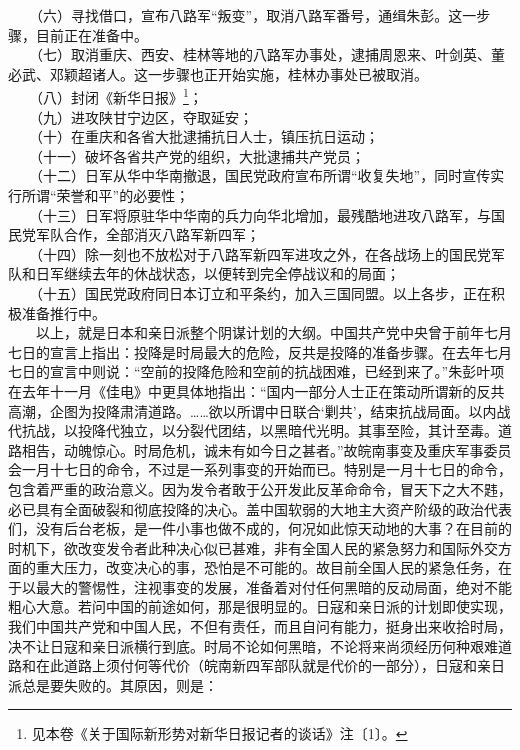 \documentclass[cn,11pt,chinese]{elegantbook}
\begin{document}
　　（六）寻找借口，宣布八路军“叛变”，取消八路军番号，通缉朱彭。这一步骤，目前正在准备中。\\
　　（七）取消重庆、西安、桂林等地的八路军办事处，逮捕周恩来、叶剑英、董必武、邓颖超诸人。这一步骤也正开始实施，桂林办事处已被取消。\\
　　（八）封闭《新华日报》\footnote[3]{ 见本卷《关于国际新形势对新华日报记者的谈话》注〔1〕。}；\\
　　（九）进攻陕甘宁边区，夺取延安；\\
　　（十）在重庆和各省大批逮捕抗日人士，镇压抗日运动；\\
　　（十一）破坏各省共产党的组织，大批逮捕共产党员；\\
　　（十二）日军从华中华南撤退，国民党政府宣布所谓“收复失地”，同时宣传实行所谓“荣誉和平”的必要性；\\
　　（十三）日军将原驻华中华南的兵力向华北增加，最残酷地进攻八路军，与国民党军队合作，全部消灭八路军新四军；\\
　　（十四）除一刻也不放松对于八路军新四军进攻之外，在各战场上的国民党军队和日军继续去年的休战状态，以便转到完全停战议和的局面；\\
　　（十五）国民党政府同日本订立和平条约，加入三国同盟。以上各步，正在积极准备推行中。\\
　　以上，就是日本和亲日派整个阴谋计划的大纲。中国共产党中央曾于前年七月七日的宣言上指出：投降是时局最大的危险，反共是投降的准备步骤。在去年七月七日的宣言中则说：“空前的投降危险和空前的抗战困难，已经到来了。”朱彭叶项在去年十一月《佳电》中更具体地指出：“国内一部分人士正在策动所谓新的反共高潮，企图为投降肃清道路。……欲以所谓中日联合‘剿共’，结束抗战局面。以内战代抗战，以投降代独立，以分裂代团结，以黑暗代光明。其事至险，其计至毒。道路相告，动魄惊心。时局危机，诚未有如今日之甚者。”故皖南事变及重庆军事委员会一月十七日的命令，不过是一系列事变的开始而已。特别是一月十七日的命令，包含着严重的政治意义。因为发令者敢于公开发此反革命命令，冒天下之大不韪，必已具有全面破裂和彻底投降的决心。盖中国软弱的大地主大资产阶级的政治代表们，没有后台老板，是一件小事也做不成的，何况如此惊天动地的大事？在目前的时机下，欲改变发令者此种决心似已甚难，非有全国人民的紧急努力和国际外交方面的重大压力，改变决心的事，恐怕是不可能的。故目前全国人民的紧急任务，在于以最大的警惕性，注视事变的发展，准备着对付任何黑暗的反动局面，绝对不能粗心大意。若问中国的前途如何，那是很明显的。日寇和亲日派的计划即使实现，我们中国共产党和中国人民，不但有责任，而且自问有能力，挺身出来收拾时局，决不让日寇和亲日派横行到底。时局不论如何黑暗，不论将来尚须经历何种艰难道路和在此道路上须付何等代价（皖南新四军部队就是代价的一部分），日寇和亲日派总是要失败的。其原因，则是：\\
\end{document}
